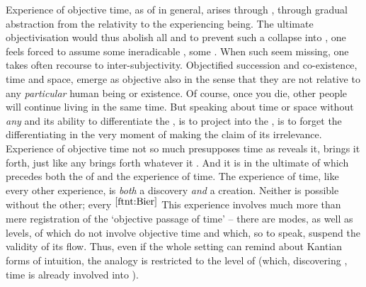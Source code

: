 \pa Experience of objective time, as of  in general, arises
through , through gradual abstraction from the relativity to
the experiencing being. The ultimate objectivisation would thus abolish all
 and to prevent such a collapse into , one feels
forced to assume some ineradicable , some .  When
such  seem missing, one takes often recourse to inter-subjectivity.
Objectified succession and co-existence, time and space, emerge as objective
also in the sense that they are not relative to any {\em particular} human being
or existence. Of course, once you die, other people will continue living in the
same time. But speaking about time or space without {\em any}  and
its ability to differentiate the , is to project
 into the , is to forget the differentiating
 in the very moment of making the claim of its irrelevance.
Experience of {objective} time not so much presupposes  time as
reveals it, brings it forth, just like any  brings forth
whatever it . And it is  in the ultimate
 of  which precedes both the  of
 and the experience of time. The experience of time, like every
other experience, is {\em both} a discovery {\em and} a creation. Neither is
possible without the other; every $^{\ref{ftnt:Bier}}$ This experience
involves much more than mere registration of the `objective passage of time' --
there are modes, as well as levels, of  which do not involve
{objective} time and which, so to speak, suspend the validity of its flow.
Thus, even if the whole setting can remind about Kantian forms of intuition, the
analogy is restricted to the level of  (which,
discovering , time is already involved into ).
%
